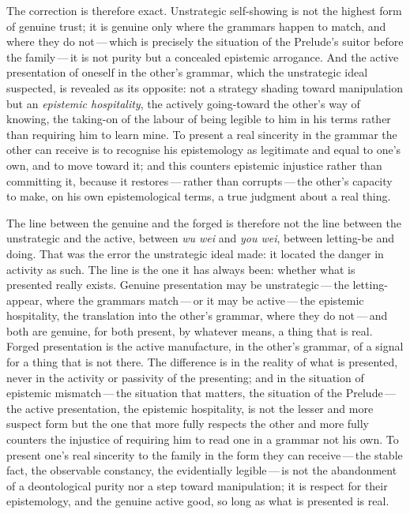 The correction is therefore exact. Unstrategic self-showing is not the highest form of genuine trust; it is genuine only where the grammars happen to match, and where they do not\,---\,which is precisely the situation of the Prelude's suitor before the family\,---\,it is not purity but a concealed epistemic arrogance. And the active presentation of oneself in the other's grammar, which the unstrategic ideal suspected, is revealed as its opposite: not a strategy shading toward manipulation but an \emph{epistemic hospitality}, the actively going-toward the other's way of knowing, the taking-on of the labour of being legible to him in his terms rather than requiring him to learn mine. To present a real sincerity in the grammar the other can receive is to recognise his epistemology as legitimate and equal to one's own, and to move toward it; and this counters epistemic injustice rather than committing it, because it restores\,---\,rather than corrupts\,---\,the other's capacity to make, on his own epistemological terms, a true judgment about a real thing.

The line between the genuine and the forged is therefore not the line between the unstrategic and the active, between \emph{wu wei} and \emph{you wei}, between letting-be and doing. That was the error the unstrategic ideal made: it located the danger in activity as such. The line is the one it has always been: whether what is presented really exists. Genuine presentation may be unstrategic\,---\,the letting-appear, where the grammars match\,---\,or it may be active\,---\,the epistemic hospitality, the translation into the other's grammar, where they do not\,---\,and both are genuine, for both present, by whatever means, a thing that is real. Forged presentation is the active manufacture, in the other's grammar, of a signal for a thing that is not there. The difference is in the reality of what is presented, never in the activity or passivity of the presenting; and in the situation of epistemic mismatch\,---\,the situation that matters, the situation of the Prelude\,---\,the active presentation, the epistemic hospitality, is not the lesser and more suspect form but the one that more fully respects the other and more fully counters the injustice of requiring him to read one in a grammar not his own. To present one's real sincerity to the family in the form they can receive\,---\,the stable fact, the observable constancy, the evidentially legible\,---\,is not the abandonment of a deontological purity nor a step toward manipulation; it is respect for their epistemology, and the genuine active good, so long as what is presented is real.

